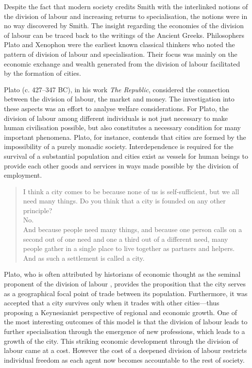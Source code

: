 \medskip \noindent Despite the fact that modern society credits Smith with the interlinked notions of the division of labour and increasing returns to specialisation, the notions were in no way discovered by Smith. The insight regarding the economies of the division of labour can be traced back to the writings of the Ancient Greeks. Philosophers Plato and Xenophon were the earliest known classical thinkers who noted the pattern of division of labour and specialisation. Their focus was mainly on the economic exchange and wealth generated from the division of labour facilitated by the formation of cities.

Plato (c. 427--347 BC), in his work \textit{The Republic}, considered the connection between the division of labour, the market and money. The investigation into these aspects was an effort to analyse welfare considerations. For Plato, the division of labour among different individuals is not just necessary to make human civilisation possible, but also constitutes a necessary condition for many important phenomena. Plato, for instance, contends that cities are formed by the impossibility of a purely monadic society. Interdependence is required for the survival of a substantial population and cities exist as vessels for human beings to provide each other goods and services in ways made possible by the division of employment.

\begin{quote}
I think a city comes to be because none of us is self-sufficient, but we all need many things. Do you think that a city is founded on any other principle?
\\
No.
\\
And because people need many things, and because one person calls on a second out of one need and one a third out of a different need, many people gather in a single place to live together as partners and helpers. And as such a settlement is called a city.

\begin{flushright}
\citet[p.~151]{Plato2007}
\end{flushright}
\end{quote}

Plato, who is often attributed by historians of economic thought as the seminal proponent of the division of labour \citep{Silvermintz2010}, provides the proposition that the city serves as a geographical focal point of trade between its population. Furthermore, it was accepted that a city survives only when it trades with other cities---thus proposing a Keynesianist perspective of regional and economic growth. One of the most interesting outcomes of this model is that the division of labour leads to further specialisation through the emergence of new professions, which leads to a growth of the city. This striking economic development through the division of labour came at a cost. However the cost of a deepened division of labour restricts individual freedom as each agent now becomes accountable to the rest of society.


